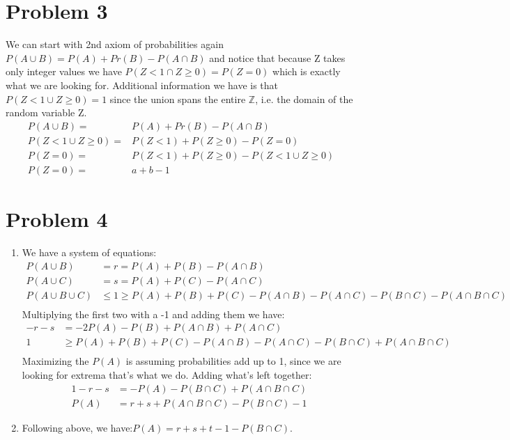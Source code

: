 \documentclass{article}
\newcommand{\1}{\mathbf{1}}
\newcommand{\Z}{\mathbb{Z}}
\begin{document}
\section*{Problem 3}
We can start with 2nd axiom of probabilities again $P(A\cup B) = P(A) + Pr(B) - P(A\cap B)$ and notice that because Z takes only integer values we have $P(Z<1 \cap Z\geq 0) = P(Z=0)$ which is exactly what we are looking for. Additional information we have is that $P(Z<1 \cup Z\geq 0) = 1$ since the union spans the entire $\Z$, i.e. the domain of the random variable Z.
\begin{align*}
P(A\cup B) =& P(A) + Pr(B) - P(A\cap B) \\
P(Z<1 \cup Z\geq 0) =& P(Z<1) + P(Z\geq 0) - P(Z=0) \\
P(Z=0) =& P(Z<1) + P(Z\geq 0) - P(Z<1 \cup Z\geq 0) \\
P(Z=0) =& a + b - 1
\end{align*}

\newpage
\section*{Problem 4}
\begin{enumerate} 
    \item We have a system of equations:
    \begin{align*}
    P(A\cup B) &= r = P(A) + P(B) - P(A\cap B) \\
    P(A\cup C) &= s = P(A) + P(C) - P(A\cap C) \\
    P(A\cup B\cup C) &\leq 1 \geq P(A) + P(B) + P(C) - P(A\cap B) - P(A\cap C) - P(B \cap C) - P(A\cap B \cap C) \\
    \end{align*}
    Multiplying the first two with a -1 and adding them we have:
    \begin{align*}
    -r - s &= -2P(A) - P(B) + P(A\cap B) + P(A\cap C) \\
    1 &\geq P(A) + P(B) + P(C) - P(A\cap B) - P(A\cap C) - P(B \cap C) + P(A\cap B \cap C) \\
    \end{align*}
    Maximizing the $P(A)$ is assuming probabilities add up to 1, since we are looking for extrema that's what we do. Adding what's left together:
    \begin{align*}
    1-r-s &= -P(A) - P(B \cap C) + P(A\cap B \cap C) \\
    P(A) &= r + s + P(A\cap B \cap C) - P(B \cap C) - 1
    \end{align*}
    \item Following above, we have:$ P(A) = r + s + t -1 - P(B \cap C)$.
\end{enumerate}
\end{document}
